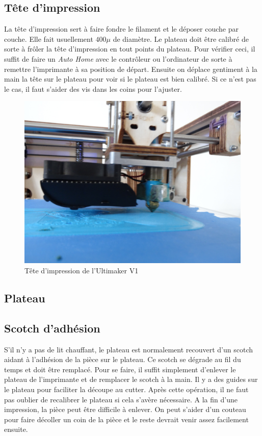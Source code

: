 \subsection{Tête d'impression}

La tête d'impression sert à faire fondre le filament et le déposer couche par couche. Elle fait usuellement $400\mu$ de diamètre. Le plateau doit être calibré de sorte à frôler la tête d'impression en tout points du plateau. Pour vérifier ceci, il suffit de faire un \emph{Auto Home} avec le contrôleur ou l'ordinateur de sorte à remettre l'imprimante à sa position de départ. Ensuite on déplace gentiment à la main la tête sur le plateau pour voir si le plateau est bien calibré. Si ce n'est pas le cas, il faut s'aider des vis dans les coins pour l'ajuster.

\begin{figure}[H]
	\centering
	\includegraphics[width=50ex]{02_materiel/head1.jpg}  
	\caption{Tête d'impression de l'Ultimaker V1}
	\label{fig:head1}
\end{figure}

\subsection{Plateau}

\subsection{Scotch d'adhésion}

S'il n'y a pas de lit chauffant, le plateau est normalement recouvert d'un scotch aidant à l'adhésion de la pièce sur le plateau. Ce scotch se dégrade au fil du temps et doit être remplacé. Pour se faire, il suffit simplement d'enlever le plateau de l'imprimante et de remplacer le scotch à la main. Il y a des guides sur le plateau pour faciliter la découpe au cutter. Après cette opération, il ne faut pas oublier de recalibrer le plateau si cela s'avère nécessaire. A la fin d'une impression, la pièce peut être difficile à enlever. On peut s'aider d'un couteau pour faire décoller un coin de la pièce et le reste devrait venir assez facilement ensuite.

